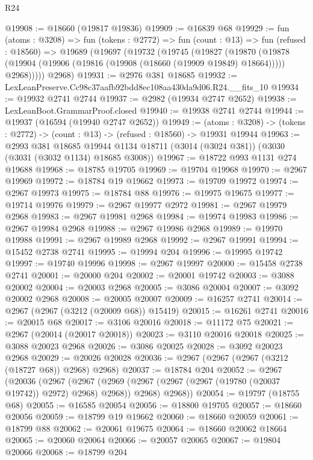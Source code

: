 \begin{lexlean}{R24}
\begin{coremodule}
@19908 := @18660 (@19817 @19836)
@19909 := @16839 @68
@19929 := fun (atoms : @3208) =>
  fun (tokens : @2772) =>
  fun (count : @13) =>
  fun (refused : @18560) =>
  @19689
    (@19697
      (@19732
        (@19745
          (@19827
            (@19870
              (@19878 (@19904 (@19906 (@19816 (@19908 (@18660 (@19909 @19849) @18664))))) @2968)))))
      @2968)
@19931 := @2976 @381 @18685
@19932 := LexLeanPreserve.Cc98c37aafb92bdd8ec108aa430da9d06.R24.__fits_10
@19934 := @19932 @2741 @2744
@19937 := @2982 (@19934 @2747 @2652)
@19938 := LexLeanBoot.GrammarProof.closed
@19940 := @19938 @2741 @2744
@19944 := @19937 (@16594 (@19940 @2747 @2652))
@19949 := (atoms : @3208) ->
  (tokens : @2772) -> (count : @13) -> (refused : @18560) -> @19931 @19944
@19963 := @2993
    @381
    @18685
    @19944
    @1134
    @18711
    (@3014 (@3024 @381))
    (@3030 (@3031 (@3032 @1134) @18685 @3008))
@19967 := @18722 @993 @1131 @274 @19688
@19968 := @18785 @19705
@19969 := @19704 @19968
@19970 := @2967 @19969
@19972 := @18784 @19 @19662
@19973 := @19709 @19972
@19974 := @2967 @19973
@19975 := @18784 @88
@19976 := @19975 @19675
@19977 := @19714 @19976
@19979 := @2967 @19977 @2972
@19981 := @2967 @19979 @2968
@19983 := @2967 @19981 @2968
@19984 := @19974 @19983
@19986 := @2967 @19984 @2968
@19988 := @2967 @19986 @2968
@19989 := @19970 @19988
@19991 := @2967 @19989 @2968
@19992 := @2967 @19991
@19994 := @15452 @2738 @2741
@19995 := @19994 @204
@19996 := @19995 @19742
@19997 := @19740 @19996
@19998 := @2967 @19997
@20000 := @15458 @2738 @2741
@20001 := @20000 @204
@20002 := @20001 @19742
@20003 := @3088 @20002
@20004 := @20003 @2968
@20005 := @3086 @20004
@20007 := @3092 @20002 @2968
@20008 := @20005 @20007
@20009 := @16257 @2741
@20014 := @2967 (@2967 (@3212 (@20009 @68)) @15419)
@20015 := @16261 @2741
@20016 := @20015 @68
@20017 := @3106 @20016
@20018 := @11172 @75
@20021 := @2967 (@20014 (@20017 @20018))
@20023 := @3110 @20016 @20018
@20025 := @3088 @20023 @2968
@20026 := @3086 @20025
@20028 := @3092 @20023 @2968
@20029 := @20026 @20028
@20036 := @2967 (@2967 (@2967 (@3212 (@18727 @68)) @2968) @2968)
@20037 := @18784 @204
@20052 := @2967
    (@20036
      (@2967
        (@2967 (@2969 (@2967 (@2967 (@2967 (@19780 (@20037 @19742)) @2972) @2968) @2968)) @2968)
        @2968))
@20054 := @19797 (@18755 @68)
@20055 := @16585 @20054
@20056 := @18800 @19705
@20057 := @18660 @20056
@20059 := @18799 @19 @19662
@20060 := @18660 @20059
@20061 := @18799 @88
@20062 := @20061 @19675
@20064 := @18660 @20062 @18664
@20065 := @20060 @20064
@20066 := @20057 @20065
@20067 := @19804 @20066
@20068 := @18799 @204

\end{coremodule}
\end{lexlean}
